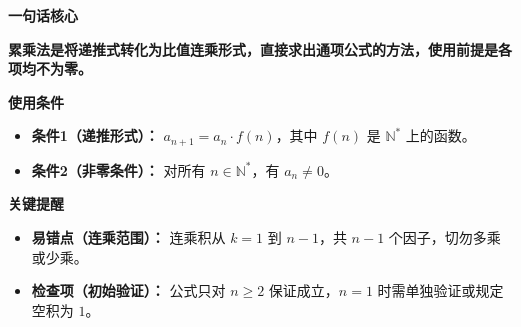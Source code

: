 \begin{summarybox}
	\textbf{\textcolor{CSummary}{一句话核心}}

	\textbf{累乘法是将递推式转化为比值连乘形式，直接求出通项公式的方法，使用前提是各项均不为零。}

	\medskip
	\textbf{\textcolor{CSummary}{使用条件}}
	\begin{itemize}[leftmargin=*, itemsep=0.5em, topsep=0.4em]
		\item \textbf{条件1（递推形式）：} $a_{n+1}=a_n\cdot f(n)$，其中 $f(n)$ 是 $\mathbb{N}^*$ 上的函数。
		\item \textbf{条件2（非零条件）：} 对所有 $n\in\mathbb{N}^*$，有 $a_n\neq 0$。
	\end{itemize}

	\medskip
	\textbf{\textcolor{CSummary}{关键提醒}}
	\begin{itemize}[leftmargin=*, itemsep=0.5em, topsep=0.4em]
		\item \textbf{易错点（连乘范围）：} 连乘积从 $k=1$ 到 $n-1$，共 $n-1$ 个因子，切勿多乘或少乘。
		\item \textbf{检查项（初始验证）：} 公式只对 $n\ge 2$ 保证成立，$n=1$ 时需单独验证或规定空积为 $1$。
	\end{itemize}
\end{summarybox}
